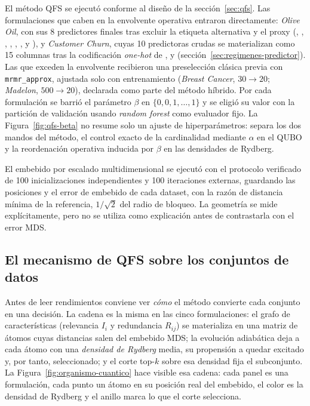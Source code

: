 El método QFS se ejecutó conforme al diseño de la sección~\ref{sec:qfs}.
Las formulaciones que caben en la envolvente operativa entraron
directamente: \textit{Olive Oil}, con sus 8 predictores finales tras
excluir la etiqueta alternativa y el proxy 
(, , ,
, , ,
 y ), y \textit{Customer Churn},
cuyas 10 predictoras crudas se materializan como 15 columnas tras la
codificación \textit{one-hot} de , 
y  (sección~\ref{sec:regimenes-predictor}). Las
que exceden la envolvente recibieron una preselección clásica previa con
\texttt{mrmr\_approx}, ajustada solo con entrenamiento (\textit{Breast
Cancer}, $30\rightarrow20$; \textit{Madelon}, $500\rightarrow20$),
declarada como parte del método híbrido. Por cada formulación se barrió el parámetro
$\beta$ en $\{0, 0{,}1, \ldots, 1\}$ y se eligió su valor con la
partición de validación usando \textit{random forest} como evaluador
fijo. La Figura~\ref{fig:qfs-beta} no resume solo un ajuste de
hiperparámetros: separa los dos mandos del método, el control exacto de
la cardinalidad mediante $\alpha$ en el QUBO y la reordenación operativa
inducida por $\beta$ en las densidades de Rydberg.

El embebido por escalado multidimensional se ejecutó con el protocolo
verificado de 100 inicializaciones independientes y 100 iteraciones
externas, guardando las posiciones y el error de embebido de cada
dataset, con la razón de distancia mínima de la referencia, $1/\sqrt{2}$ del
radio de bloqueo. La geometría se mide explícitamente, pero no se
utiliza como explicación antes de contrastarla con el error MDS.

\subsection{El mecanismo de QFS sobre los conjuntos de datos}
\label{sec:mecanismo-qfs}

Antes de leer rendimientos conviene ver \emph{cómo} el método convierte
cada conjunto en una decisión. La cadena es la misma en las cinco
formulaciones: el grafo de características (relevancia $I_i$ y redundancia
$R_{ij}$) se materializa en una matriz de átomos cuyas distancias salen
del embebido MDS; la evolución adiabática deja a cada átomo con una
\emph{densidad de Rydberg} media, su propensión a quedar excitado y, por
tanto, seleccionado; y el corte top-$k$ sobre esa densidad fija el
subconjunto. La Figura~\ref{fig:organismo-cuantico} hace visible esa
cadena: cada panel es una formulación, cada punto un átomo en su posición
real del embebido, el color es la densidad de Rydberg y el anillo marca
lo que el corte selecciona.

